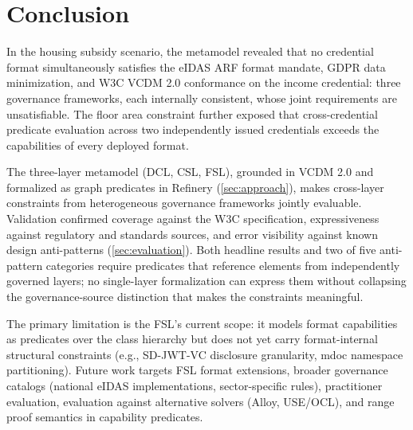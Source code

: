 \section{Conclusion}\label{sec:conclusion}

In the housing subsidy scenario, the metamodel revealed that no credential format simultaneously satisfies the eIDAS ARF format mandate, GDPR data minimization, and W3C VCDM 2.0 conformance on the income credential: three governance frameworks, each internally consistent, whose joint requirements are unsatisfiable. The floor area constraint further exposed that cross-credential predicate evaluation across two independently issued credentials exceeds the capabilities of every deployed format.

The three-layer metamodel (DCL, \ac{CSL}, \ac{FSL}), grounded in \ac{VCDM} 2.0 and formalized as graph predicates in Refinery (\autoref{sec:approach}), makes cross-layer constraints from heterogeneous governance frameworks jointly evaluable. Validation confirmed coverage against the W3C specification, expressiveness against regulatory and standards sources, and error visibility against known design anti-patterns (\autoref{sec:evaluation}). Both headline results and two of five anti-pattern categories require predicates that reference elements from independently governed layers; no single-layer formalization can express them without collapsing the governance-source distinction that makes the constraints meaningful.

The primary limitation is the \ac{FSL}'s current scope: it models format capabilities as predicates over the class hierarchy but does not yet carry format-internal structural constraints (e.g., SD-JWT-VC disclosure granularity, mdoc namespace partitioning). Future work targets FSL format extensions, broader governance catalogs (national eIDAS implementations, sector-specific rules), practitioner evaluation, evaluation against alternative solvers (Alloy, USE/OCL), and range proof semantics in capability predicates.
